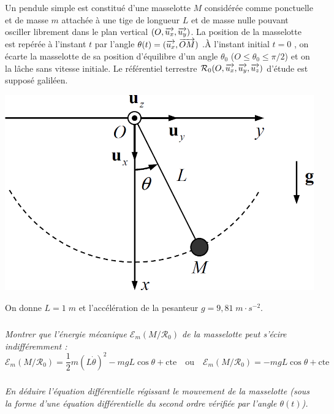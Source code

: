 \documentclass[10pt,oneside]{article}
\begin{document}
\begin{minipage}[c]{.6\linewidth}
Un pendule simple est constitué d’une masselotte $M$ considérée comme ponctuelle et de masse $m$ attachée à une tige de longueur $L$ et de masse nulle pouvant osciller librement dans le plan vertical $(O ,\overrightarrow{u_x} ,\overrightarrow{u_y} )$. La position de la masselotte
est repérée à l’instant $t$ par l’angle $\theta(t) = (\overrightarrow{u_x} , \overrightarrow{OM})$ .À l’instant initial $t = 0$ , on écarte la masselotte de sa position d’équilibre d’un angle  $\theta_0$  ($O\leq \theta_0\leq\pi/2$) et on la lâche sans vitesse initiale. Le
référentiel terrestre $\mathcal{R}_0(O,\overrightarrow{u_x},\overrightarrow{u_y},\overrightarrow{u_z})$ d’étude est supposé galiléen.
\end{minipage}\hfill
\begin{minipage}[c]{.35\linewidth}
\begin{center}
\includegraphics[width=.95\textwidth]{images/pendule}
\end{center}
\end{minipage}

On donne $L=1\;m$ et l'accélération de la pesanteur $g=9,81\; m\cdot s^{-2}$. 


\subparagraph{\label{q1}}
\textit{Montrer que l’énergie mécanique $\mathcal{E}_m(M/\mathcal{R_0})$ de la masselotte peut s'écire indifféremment :}
\begin{equation}
\label{eq1}
\mathcal{E}_m(M/\mathcal{R}_0) = \dfrac{1}{2}m\left( L\dot{\theta} \right)^2 -mgL\cos\theta + \text{cte} \quad \text{ou}\quad \mathcal{E}_m(M/\mathcal{R}_0) = -mgL\cos\theta + \text{cte}
\end{equation}

\subparagraph{}
\textit{En déduire l'équation différentielle régissant le mouvement de la masselotte (sous la forme d’une équation différentielle du second ordre vérifiée par l’angle $\theta(t)$).}
\end{document}
